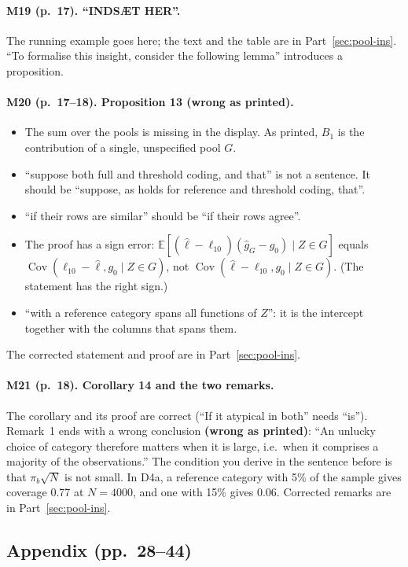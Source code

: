 \documentclass[11pt]{article}
\providecommand{\E}{\mathbb{E}}
\theoremstyle{plain}
\theoremstyle{remark}
\begin{document}
\paragraph{M19 (p.~17). ``INDSÆT HER''.} The running example goes here; the text
and the table are in Part~\ref{sec:pool-ins}. ``To formalise this insight,
consider the following lemma'' introduces a proposition.

\paragraph{M20 (p.~17--18). Proposition 13 (wrong as printed).}
\begin{itemize}
\item The sum over the pools is missing in the display. As printed, $B_1$ is
  the contribution of a single, unspecified pool $G$.
\item ``suppose both full and threshold coding, and that'' is not a sentence.
  It should be ``suppose, as holds for reference and threshold coding, that''.
\item ``if their rows are similar'' should be ``if their rows agree''.
\item The proof has a sign error:
  $\E[(\hat\ell-\ell_{10})(\hat g_G-g_0)\mid Z\in G]$ equals
  $\operatorname{Cov}(\ell_{10}-\hat\ell,g_0\mid Z\in G)$, not
  $\operatorname{Cov}(\hat\ell-\ell_{10},g_0\mid Z\in G)$. (The statement has the
  right sign.)
\item ``with a reference category spans all functions of $Z$'': it is the
  intercept together with the columns that spans them.
\end{itemize}
The corrected statement and proof are in Part~\ref{sec:pool-ins}.

\paragraph{M21 (p.~18). Corollary 14 and the two remarks.}
The corollary and its proof are correct (``If it atypical in both'' needs
``is''). Remark~1 ends with a wrong conclusion \textbf{(wrong as printed)}:
``An unlucky choice of category therefore matters when it is large, i.e.\ when
it comprises a majority of the observations.'' The condition you derive in the
sentence before is that $\pi_b\sqrt N$ is not small. In D4a, a reference
category with 5\% of the sample gives coverage 0.77 at $N=4000$, and one with
15\% gives 0.06. Corrected remarks are in Part~\ref{sec:pool-ins}.

\subsection{Appendix (pp.~28--44)}
\end{document}
